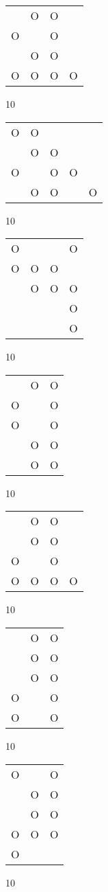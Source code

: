 \begin{tabular}{|m{0.2cm}m{0.2cm}m{0.2cm}m{0.2cm}|}\hline
 &O&O& \\
O& &O& \\
 &O&O& \\
O&O&O&O\\
\hline\end{tabular}10
\begin{tabular}{|m{0.2cm}m{0.2cm}m{0.2cm}m{0.2cm}m{0.2cm}|}\hline
O&O& & & \\
 &O&O& & \\
O& &O&O& \\
 &O&O& &O\\
\hline\end{tabular}10
\begin{tabular}{|m{0.2cm}m{0.2cm}m{0.2cm}m{0.2cm}|}\hline
O& & &O\\
O&O&O& \\
 &O&O&O\\
 & & &O\\
 & & &O\\
\hline\end{tabular}10
\begin{tabular}{|m{0.2cm}m{0.2cm}m{0.2cm}|}\hline
 &O&O\\
O& &O\\
O& &O\\
 &O&O\\
 &O&O\\
\hline\end{tabular}10
\begin{tabular}{|m{0.2cm}m{0.2cm}m{0.2cm}m{0.2cm}|}\hline
 &O&O& \\
 &O&O& \\
O& &O& \\
O&O&O&O\\
\hline\end{tabular}10
\begin{tabular}{|m{0.2cm}m{0.2cm}m{0.2cm}|}\hline
 &O&O\\
 &O&O\\
 &O&O\\
O& &O\\
O& &O\\
\hline\end{tabular}10
\begin{tabular}{|m{0.2cm}m{0.2cm}m{0.2cm}|}\hline
O& &O\\
 &O&O\\
 &O&O\\
O&O&O\\
O& & \\
\hline\end{tabular}10
